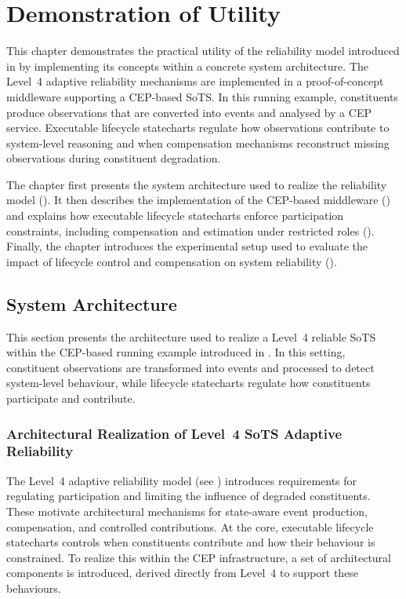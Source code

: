 \chapter{Demonstration of Utility}\label{ch:demonstration}
This chapter demonstrates the practical utility of the reliability model introduced in  by implementing its concepts within a concrete system architecture. The Level~4 adaptive reliability mechanisms are implemented in a proof-of-concept middleware supporting a CEP-based SoTS. In this running example, constituents produce observations that are converted into events and analysed by a CEP service. Executable lifecycle statecharts regulate how observations contribute to system-level reasoning and when compensation mechanisms reconstruct missing observations during constituent degradation.

The chapter first presents the system architecture used to realize the reliability model (). It then describes the implementation of the CEP-based middleware () and explains how executable lifecycle statecharts enforce participation constraints, including compensation and estimation under restricted roles (). Finally, the chapter introduces the experimental setup used to evaluate the impact of lifecycle control and compensation on system reliability ().


\section{System Architecture}\label{sec:architecture}
This section presents the architecture used to realize a Level~4 reliable SoTS within the CEP-based running example introduced in . In this setting, constituent observations are transformed into events and processed to detect system-level behaviour, while lifecycle statecharts regulate how constituents participate and contribute.

\subsection{Architectural Realization of Level~4 SoTS Adaptive Reliability}
The Level~4 adaptive reliability model (see ) introduces requirements for regulating participation and limiting the influence of degraded constituents. These motivate architectural mechanisms for state-aware event production, compensation, and controlled contributions. At the core, executable lifecycle statecharts controls when constituents contribute and how their behaviour is constrained. To realize this within the CEP infrastructure, a set of architectural components is introduced, derived directly from Level~4 to support these behaviours.

